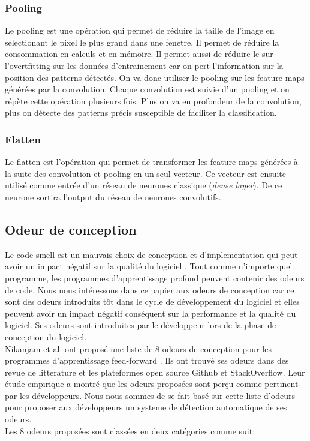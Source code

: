 \subsubsection*{Pooling}
Le pooling est une opération qui permet de réduire la taille de l'image en
selectionant le pixel le plus grand dans une fenetre. Il permet de réduire la
consommation en calculs et en mémoire. Il permet aussi de réduire le sur
l'overtfitting sur les données d'entrainement car on pert l'information sur la
position des patterns détectés. On va donc utiliser le pooling sur les feature
maps générées par la convolution. Chaque convolution est suivie d'un pooling
et on répète cette opération plusieurs fois. Plus on va en profondeur de la
convolution, plus on détecte des patterns précis susceptible de faciliter la classification.\\

\subsubsection*{Flatten}
Le flatten est l'opération qui permet de transformer les feature maps générées à
la suite des convolution et pooling en un seul vecteur. Ce vecteur est ensuite
utilisé comme entrée d'un réseau de neurones classique (\emph{dense layer}). De ce
neurone sortira l'output du réseau de neurones convolutifs.

\subsection{Odeur de conception}
Le code smell est un mauvais choix de conception et d'implementation qui peut
avoir un impact négatif sur la qualité du logiciel \cite{fowler1997refactoring}.
Tout comme n'importe quel programme, les programmes d'apprentissage profond
peuvent contenir des odeurs de code. Nous nous intéressons dans ce papier aux
odeurs de conception car ce sont des odeurs introduits tôt dans le cycle de
développement du logiciel et elles peuvent avoir un impact négatif conséquent
sur la performance et la qualité du logiciel. Ses odeurs sont introduites par le
développeur lors de la phase de  conception du logiciel.\\ Nikanjam et al. ont
proposé une liste de 8 odeurs de conception pour les programmes d'apprentissage
feed-forward \cite{nikanjam2019deep}. Ils ont trouvé ses odeurs dans des revue
de litterature et les plateformes open source Github et StackOverflow. Leur étude empirique a montré que les
odeurs proposées sont perçu comme pertinent par les développeurs. Nous nous
sommes de se fait basé sur cette liste d'odeurs pour proposer aux développeurs
un systeme de détection automatique de ses odeurs.\\ Les 8 odeurs proposées sont
classées en deux catégories comme suit:

